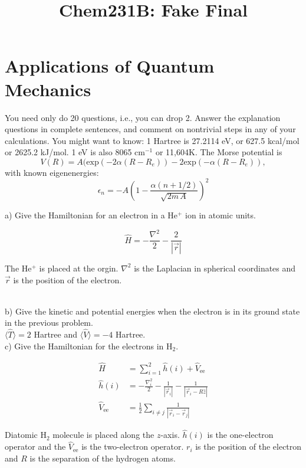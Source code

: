 \documentclass{article}
\title{Chem231B: Fake Final} %
\begin{document}
\maketitle

\section*{Applications of Quantum Mechanics}

You need only do 20 questions, i.e., you can drop 2. Answer the explanation questions in complete
sentences, and comment on nontrivial steps in any of your calculations. You might want to know:
1 Hartree is 27.2114 eV, or 627.5 kcal/mol or 2625.2 kJ/mol. 1 eV is also 8065 cm$^{-1}$ or 11,604K.
The Morse potential is
\begin{equation}
  V(R) = A(\text{exp}(-2\alpha(R-R_e))-2\text{exp}(-\alpha(R-R_e)),
\end{equation}
with known eigenenergies:
\begin{equation}
  \epsilon_n = -A(1 - \frac{\alpha(n+1/2)}{\sqrt{2m\,A}})^2
\end{equation}

\noindent a) Give the Hamiltonian for an electron in a He$^+$ ion in atomic units.

{\color{blue}
  \begin{equation*}
    \hat{H} = -\frac{\nabla^2}{2} - \frac{2}{|\vec{r}|}
  \end{equation*}

  The He$^+$ is placed at the orgin. $\nabla^2$ is the Laplacian in spherical coordinates and
  $\vec{r}$ is the position of the electron.
}
\\

\noindent b) Give the kinetic and potential energies when the electron is in its ground state
in the previous problem.
\\

{\color{blue} $\langle \hat{T} \rangle = 2$ Hartree and $\langle \hat{V} \rangle = -4$ Hartree.}
\\

\noindent c) Give the Hamiltonian for the electrons in H$_2$.

{\color{blue}
  \begin{align*}
    \hat{H} & = \sum_{i=1}^2\hat{h}(i) + \hat{V}_{\text{ee}} \\
    \hat{h}(i) & = -\frac{\nabla_i^2}{2} - \frac{1}{|\vec{r}_i|} -\frac{1}{|\vec{r}_i - R\hat{z}|} \\
    \hat{V}_{\text{ee}} & = \frac{1}{2}\sum_{i\neq j} \frac{1}{|\vec{r}_i-\vec{r}_j|}
  \end{align*}

  Diatomic H$_2$ molecule is placed along the $z$-axis. $\hat{h}(i)$ is the one-electron
  operator and the $\hat{V}_{\text{ee}}$ is the two-electron operator. $r_i$ is the position
  of the electron and $R$ is the separation of the hydrogen atoms.
}
\\
\end{document}
